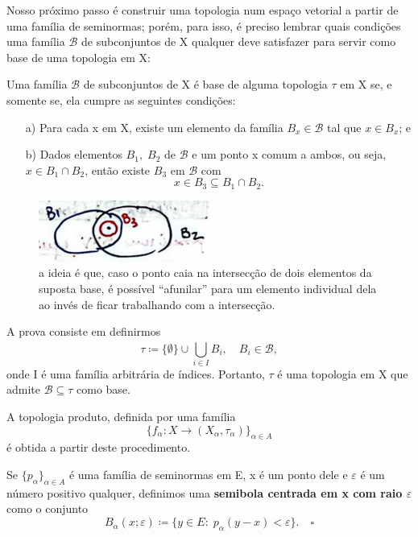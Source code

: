 \documentclass[../distribution_theory_notes.tex]{subfiles}
\begin{document}
Nosso próximo passo é construir uma topologia num espaço vetorial a partir de uma família de seminormas; porém, para isso, é preciso lembrar quais condições uma família \(\mathcal{B}\) de subconjuntos de X qualquer deve satisfazer para servir como base de uma topologia em X:
\begin{theorem*}
	Uma família \(\mathcal{B}\) de subconjuntos de X é base de alguma topologia \(\tau \) em X se, e somente se, ela cumpre as seguintes condições:
	\begin{itemize}
		\item[a)] Para cada x em X, existe um elemento da família \(B_{x}\in \mathcal{B}\) tal que \(x\in B_{x}\); e
		\item[b)] Dados elementos \(B_1,\; B_2\) de \(\mathcal{B}\) e um ponto x comum a ambos, ou seja, \(x\in B_1\cap B_2\), então existe \(B_3\) em \(\mathcal{B}\) com
		      \[
			      x\in B_3\subseteq B_1\cap B_2.
		      \]
	\end{itemize}
\end{theorem*}
\begin{figure}[H]
	\begin{center}
		\includegraphics[height=0.5\textheight, width=0.5\textwidth, keepaspectratio]{./Images/basis_X_02.png}
	\end{center}
	\caption{a ideia é que, caso o ponto caia na intersecção de dois elementos da suposta base, é possível ``afunilar'' para um elemento individual dela ao invés de ficar trabalhando com a intersecção.}
\end{figure}
\begin{proof*}
	A prova consiste em definirmos
	\[
		\tau \coloneqq \{\emptyset \}\cup \bigcup_{i\in I}^{}B_{i}, \quad B_{i}\in \mathcal{B},
	\]
	onde I é uma família arbitrária de índices. Portanto, \(\tau \) é uma topologia em X que admite \(\mathcal{B}\subseteq \tau \) como base. \qedsymbol
\end{proof*}
\begin{example}
	A topologia produto, definida por uma família
	\[
		\{f_{\alpha }:X\rightarrow (X_{\alpha }, \tau_{\alpha })\}_{\alpha \in A}
	\]
	é obtida a partir deste procedimento.
\end{example}
\begin{def*}
	Se \(\{p_{\alpha }\}_{\alpha \in A}\) é uma família de seminormas em E, x é um ponto dele e \(\varepsilon \) é um número positivo qualquer, definimos uma \textbf{semibola centrada em x com raio \(\varepsilon \)} como o conjunto
	\[
		B_{\alpha }(x; \varepsilon )\coloneqq \{y\in E:\; p_{\alpha }(y-x)<\varepsilon \}. \quad \square
	\]
\end{def*}
\end{document}
